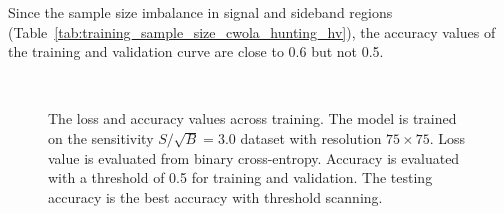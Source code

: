 \documentclass[12pt]{article}
\begin{document}
			Since the sample size imbalance in signal and sideband regions (Table~\ref{tab:training_sample_size_cwola_hunting_hv}), the accuracy values of the training and validation curve are close to 0.6 but not 0.5. 
			\begin{figure}[htpb]
				\centering
				 \\ 
				\caption{The loss and accuracy values across training. The model is trained on the sensitivity $S / \sqrt{B} = 3.0$ dataset with resolution $75\times 75$. Loss value is evaluated from binary cross-entropy. Accuracy is evaluated with a threshold of 0.5 for training and validation. The testing accuracy is the best accuracy with threshold scanning.}
				\label{fig:loss_acc_across_training_SB_3_res_75}
			\end{figure}
\end{document}
